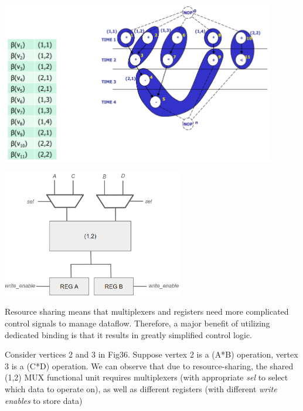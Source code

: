 \documentclass{article}
\begin{document}
\begin{minipage}{0.6\linewidth}
    \includegraphics[width=12cm]{S2/binding2.PNG}
    \captionsetup{justification=centering}
\end{minipage}%
\hfill
\begin{minipage}{0.4\linewidth}
    \includegraphics[width=8cm]{S2/complicatedControl.PNG}
    \captionsetup{justification=centering}
\end{minipage}%


Resource sharing means that multiplexers and registers need more complicated control signals to manage dataflow.
Therefore, a major benefit of utilizing dedicated binding is that it results in greatly simplified control logic.

Consider vertices 2 and 3 in Fig36. 
Suppose vertex 2 is a (A*B) operation, vertex 3 is a (C*D) operation. 
We can observe that due to resource-sharing, the shared (1,2) MUX functional unit requires multiplexers (with appropriate \textit{sel} to select which data to operate on), as well as different registers (with different \textit{write enables} to store data)

\newpage
\end{document}
